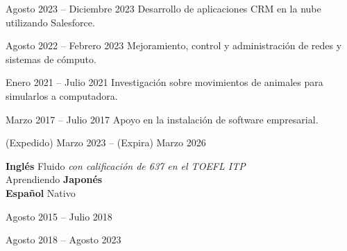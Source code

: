 \documentclass[a4paper,11pt]{memoir} %
\begin{document}
\userinformation %

\framebreak %


\heading{\fullname} %



\Sep


{Agosto 2023 -- Diciembre 2023}
{Desarrollo de aplicaciones CRM en la nube utilizando Salesforce.}

{Agosto 2022 -- Febrero 2023}
{Mejoramiento, control y administración de redes y sistemas de cómputo.}

{Enero 2021 -- Julio 2021}
{Investigación sobre movimientos de animales para simularlos a computadora.}

{Marzo 2017 -- Julio 2017}
{Apoyo en la instalación de software empresarial.}

\Sep


{(Expedido) Marzo 2023 -- (Expira) Marzo 2026}{}

\Sep


\techtable

\Sep


\bluebullet \textbf{Inglés} Fluido \textit{con calificación de 637 en el TOEFL ITP} \\
\bluebullet Aprendiendo \textbf{Japonés} \\
\bluebullet \textbf{Español} Nativo \\


{Agosto 2015 -- Julio 2018}{}

{Agosto 2018 -- Agosto 2023}{}

\end{document}
